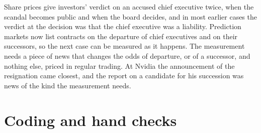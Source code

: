 \documentclass[11pt,a4paper]{article}
\begin{document}
Share prices give investors' verdict on an accused chief executive twice, when the scandal becomes public and when the board decides, and in most earlier cases the verdict at the decision was that the chief executive was a liability. Prediction markets now list contracts on the departure of chief executives and on their successors, so the next case can be measured as it happens. The measurement needs a piece of news that changes the odds of departure, or of a successor, and nothing else, priced in regular trading. At Nvidia the announcement of the resignation came closest, and the report on a candidate for his succession was news of the kind the measurement needs.




\appendix
\section{Coding and hand checks}\label{app:coding}
\end{document}
